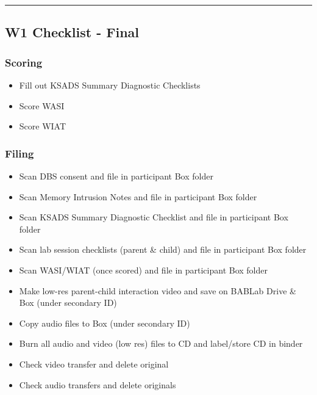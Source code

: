 \documentclass[]{book}
\providecommand{\tightlist}{%
  \setlength{\itemsep}{0pt}\setlength{\parskip}{0pt}}
\begin{document}
\begin{center}\rule{0.5\linewidth}{0.5pt}\end{center}

\hypertarget{w1-checklist---final}{%
\subsection{W1 Checklist - Final}\label{w1-checklist---final}}

\hypertarget{scoring}{%
\subsubsection{Scoring}\label{scoring}}

\begin{itemize}
\tightlist
\item
  Fill out KSADS Summary Diagnostic Checklists
\item
  Score WASI
\item
  Score WIAT
\end{itemize}

\hypertarget{filing-1}{%
\subsubsection{Filing}\label{filing-1}}

\begin{itemize}
\tightlist
\item
  Scan DBS consent and file in participant Box folder
\item
  Scan Memory Intrusion Notes and file in participant Box folder
\item
  Scan KSADS Summary Diagnostic Checklist and file in participant Box folder
\item
  Scan lab session checklists (parent \& child) and file in participant Box folder
\item
  Scan WASI/WIAT (once scored) and file in participant Box folder
\item
  Make low-res parent-child interaction video and save on BABLab Drive \& Box (under secondary ID)
\item
  Copy audio files to Box (under secondary ID)
\item
  Burn all audio and video (low res) files to CD and label/store CD in binder
\item
  Check video transfer and delete original
\item
  Check audio transfers and delete originals
\end{itemize}
\end{document}
